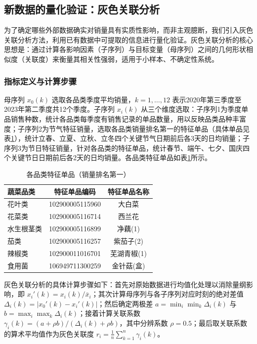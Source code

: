 \documentclass[withoutpreface]{cumcmthesis}
\begin{document}
\subsection{新数据的量化验证：灰色关联分析}

为了确定哪些外部数据确实对销量具有实质性影响，而非主观臆断，我们引入灰色关联分析方法，利用已有数据中可提取的信息进行量化验证。灰色关联分析的核心思想是：通过计算各影响因素（子序列）与目标变量（母序列）之间的几何形状相似度（关联度）来衡量其相关性强弱，适用于小样本、不确定性系统。

\subsubsection{指标定义与计算步骤}

母序列 $x_0(k)$ 选取各品类季度平均销量，$k=1,\dots,12$ 表示2020年第三季度至2023年第二季度共12个季度。子序列 $x_i(k)$ 从三个维度选取：子序列1为季度单品销售种数，统计各品类每季度有销售记录的单品数量，用以反映品类品种丰富度；子序列2为节气特征销量，选取各品类销量排名第一的特征单品（具体单品见表\ref{tab:feature_items}），统计立春、立夏、立秋、立冬四个关键节气日期前后各3天的日均销量；子序列3为节日特征销量，针对各品类的特征单品，统计春节、端午、七夕、国庆四个关键节日日期前后各2天的日均销量。各品类特征单品如表\ref{tab:feature_items}所示。

\begin{table}[H]
\centering
\caption{各品类特征单品（销量排名第一）}
\label{tab:feature_items}
\begin{tabular}{lcc}
\toprule
蔬菜品类 & 特征单品编码 & 特征单品名称 \\
\midrule
花叶类 & 102900005115960 & 大白菜 \\
花菜类 & 102900005116714 & 西兰花 \\
水生根茎类 & 102900005116899 & 净藕(1) \\
茄类 & 102900005116257 & 紫茄子(2) \\
辣椒类 & 102900011016701 & 芜湖青椒(1) \\
食用菌 & 106949711300259 & 金针菇(盒) \\
\bottomrule
\end{tabular}
\end{table}

灰色关联分析的具体计算步骤如下：首先对原始数据进行均值化处理以消除量纲影响，即 $x_i'(k) = x_i(k)/\bar{x}_i$；其次计算母序列与各子序列对应时刻的绝对差值 $\Delta_i(k) = |x_0'(k) - x_i'(k)|$；然后确定两极差 $a = \min_i\min_k\Delta_i(k)$ 与 $b = \max_i\max_k\Delta_i(k)$；接着计算关联系数 $\gamma_i(k) = (a + \rho b)/(\Delta_i(k) + \rho b)$，其中分辨系数 $\rho=0.5$；最后取关联系数的算术平均值作为灰色关联度 $r_i = \frac{1}{n}\sum_{k=1}^{n}\gamma_i(k)$。
\end{document}
